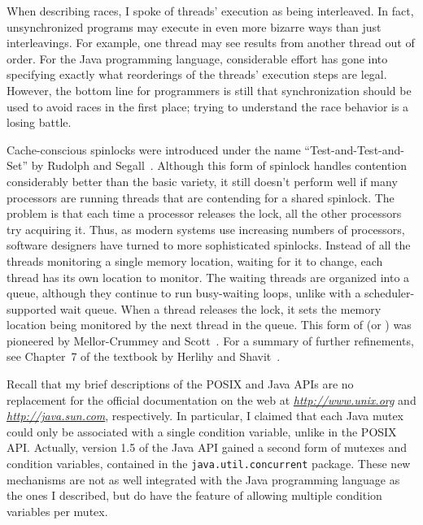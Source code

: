 When describing races, I spoke of threads' execution as being
interleaved.  In fact, unsynchronized programs may execute in even
more bizarre ways than just interleavings.  For example, one thread
may see results from another thread out of order.  For the Java programming
language, considerable effort has gone into specifying exactly what
reorderings of the threads' execution steps are legal.  However, the
bottom line for programmers is still that synchronization should be
used to avoid races in the first place; trying to understand the race
behavior is a losing battle.

Cache-conscious spinlocks were introduced under the name ``Test-and-Test-and-Set'' by Rudolph and Segall~\cite{max1200}.  Although this form of spinlock handles contention considerably better than the basic variety, it still doesn't perform well if many processors are running threads that are contending for a shared spinlock.  The problem is that each time a processor releases the lock, all the other processors try acquiring it. Thus, as modern systems use increasing numbers of processors, software designers have turned to more sophisticated spinlocks.  Instead of all the threads monitoring a single memory location, waiting for it to change, each thread has its own location to monitor.  The waiting threads are organized into a queue, although they continue to run busy-waiting loops, unlike with a scheduler-supported wait queue.  When a thread releases the lock, it sets the memory location being monitored by the next thread in the queue.  This form of  (or ) was pioneered by Mellor-Crummey and Scott~\cite{max1201}. For a summary of further refinements, see Chapter~7 of the textbook by Herlihy and Shavit~\cite{max1202}.

Recall that my brief descriptions of the POSIX and Java APIs are no
replacement for the official documentation on the web at
\textit{\url{http://www.unix.org}} and \textit{\url{http://java.sun.com}}, respectively.  In particular, I claimed that each Java mutex could only be associated with a single condition variable, unlike in the POSIX API. Actually, version 1.5 of the Java API gained a second form of mutexes and condition variables, contained in the \verb|java.util.|\linebreak[0]\verb|concurrent| package. These new mechanisms are not as well integrated with the Java programming language as the ones I described, but do have the feature of allowing multiple condition variables per mutex.

